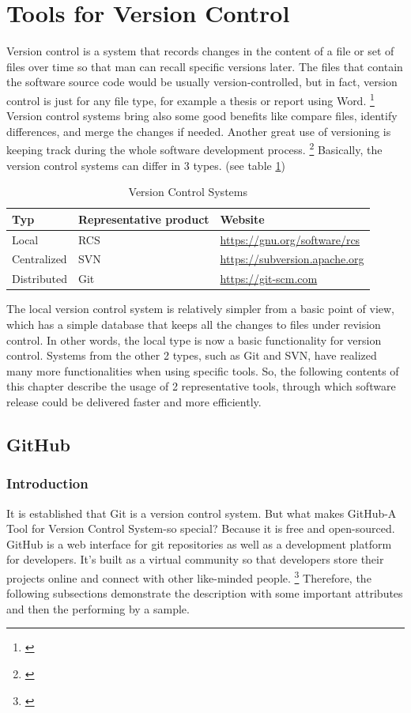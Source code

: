 \documentclass[12pt,a4paper,bibliography=totocnumbered,listof=totocnumbered]{article}
\begin{document}
\section{Tools for Version Control}
Version control is a system that records changes in the content of a file or set of files over time so that man can recall specific versions later.
The files that contain the software source code would be usually version-controlled, but in fact, version control is just for any file type, for example a thesis or report using Word.
\footnote[2]{\cite{ref2}}
Version control systems bring also some good benefits like compare files, identify differences, and merge the changes if needed. Another great use of versioning is keeping track during the whole software development process. 
\footnote[3]{\cite{ref3}}
Basically, the version control systems can differ in 3 types. (see table \ref{tab:VersionControlSystems})
\vspace{1em}
\begin{table}[!h]
	\centering
	\begin{tabular}{|l|l|l|}
		\hline
		\textbf{Typ} & \textbf{Representative product} & \textbf{Website} \\
		\hline
		Local & RCS & \url{https://gnu.org/software/rcs}\\
		\hline
		Centralized & SVN & \url{https://subversion.apache.org}\\
		\hline
		Distributed & Git & \url{https://git-scm.com} \\
		\hline
	\end{tabular}
	\caption{Version Control Systems}
	\label{tab:VersionControlSystems}
\end{table}
\newline
The local version control system is relatively simpler from a basic point of view, which has a simple database that keeps all the changes to files under revision control. 
In other words, the local type is now a basic functionality for version control. Systems from the other 2 types, such as Git and SVN, have realized many more functionalities when using specific tools.
So, the following contents of this chapter describe the usage of 2 representative tools, through which software release could be delivered faster and more efficiently. 
 
\subsection{GitHub}
\subsubsection{Introduction}
It is established that Git is a version control system. But what makes GitHub-A Tool for Version Control System-so special?
Because it is free and open-sourced. GitHub is a web interface for git repositories as well as a development platform for developers. It's built as a virtual community so that developers store their projects online and connect with other like-minded people.  
\footnote[4]{\cite{ref4}}  
Therefore, the following subsections demonstrate the description with some important attributes and then the performing by a sample.
\end{document}
